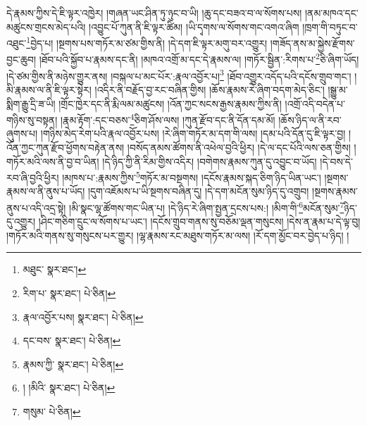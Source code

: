 དེ་རྣམས་ཀྱིས་དེ་ཇི་ལྟར་འཁྱེར། །གཞན་ཡང་ཤིན་ཏུ་ཉུང་བ་ཡི། །ཆུ་དང་བཟའ་བ་ལ་སོགས་པས། །ནམ་མཁའ་དང་མཚུངས་གྲངས་མེད་པའི། །འབྱུང་པོ་ཀུན་ནི་ཇི་ལྟར་ཚིམ། །ཡི་དྭགས་ལ་སོགས་གང་འགའ་ཞིག །ཁྲག་གི་བཏུང་བ་འཐུང་\footnote{མཐུང་  སྣར་ཐང་། }བྱེད་པ། །སྔགས་པས་གཏོར་མ་ཙམ་གྱིས་ནི། །དེ་དག་ཇི་ལྟར་མགུ་བར་འགྱུར། །གཟོད་ནས་མ་སྐྱེས་རྫོགས་བྱང་ཆུབ། །ཐོབ་པའི་སྐྱོབ་པ་རྣམས་དང་ནི། །མཁའ་འགྲོ་མ་དང་དེ་རྣམས་ལ། །གཏོར་སྦྱིན་:རིགས་པ་\footnote{རིག་པ་  སྣར་ཐང་།  པེ་ཅིན། }ཅི་ཞིག་ཡོད། །དེ་ཙམ་གྱིས་ནི་མཉེས་གྱུར་ནས། །བསྐལ་པ་མང་པོར་:རྣལ་འབྱོར་པ།\footnote{རྣལ་འབྱོར་པས།  སྣར་ཐང་།  པེ་ཅིན། } །ཐོབ་འགྱུར་འདོད་པའི་དངོས་གྲུབ་གང་། །མི་རྣམས་ལ་ནི་ཇི་ལྟར་སྟེར། །འདིར་ནི་བརྗོད་བྱ་རང་བཞིན་གྱིས། །ཆོས་རྣམས་རེ་ཞིག་བདག་མེད་ཅིང་། །སྒྱུ་མ་སྨིག་རྒྱུ་དྲི་ཟ་ཡི། །གྲོང་ཁྱེར་དང་ནི་རྨི་ལམ་མཚུངས། །འོན་ཀྱང་སངས་རྒྱས་རྣམས་ཀྱིས་ནི། །འགྲོ་འདི་བདེན་པ་གཉིས་སུ་བསྟན། །རྣམ་རྟོག་:དང་བཅས་\footnote{དང་བས་  སྣར་ཐང་།  པེ་ཅིན། }ཅིག་ཤོས་ལས། །ཀུན་རྫོབ་དང་ནི་དོན་དམ་མོ། །ཆོས་ཉིད་ལ་ནི་རབ་ཞུགས་པ། །གཉིས་མེད་རེག་པའི་རྣལ་འབྱོར་པས། །རེ་ཞིག་གཏོར་མ་དག་གི་ལས། །དམ་པའི་དོན་དུ་ཇི་ལྟར་བྱ། །འོན་ཀྱང་ཀུན་རྫོབ་ཕྱོགས་བརྟེན་ནས། །བསོད་ནམས་ཚོགས་ནི་འཕེལ་བྱའི་ཕྱིར། །དེ་ལ་དང་པོའི་ལས་ཅན་གྱིས། །གཏོར་མའི་ལས་ནི་བྱ་བ་ཡིན། །དེ་ཉིད་ཀྱི་ནི་རིམ་གྱིས་འདིར། །བགེགས་རྣམས་ཀུན་དུ་འབྱུང་བ་ཡོད། །དེ་བས་དེ་རབ་ཞི་བྱའི་ཕྱིར། །མཁས་པ་:རྣམས་ཀྱིས་\footnote{རྣམས་ཀྱི་  སྣར་ཐང་།  པེ་ཅིན། }གཏོར་མ་བསྔགས། །དངོས་རྣམས་སྐད་ཅིག་ཉིད་ཡིན་ཡང་། །སྔགས་རྣམས་ལ་ནི་ནུས་པ་ཡོད། །དུག་འཇོམས་པ་ཡི་སྔགས་བཞིན་དུ། །དེ་དག་མངོན་སུམ་ཉིད་དུ་འགྲུབ། །སྔགས་རྣམས་ནུས་པ་འདི་འདྲ་སྟེ། །མི་སྣང་ལྷ་ཚོགས་གང་ཡིན་པ། །དེ་ཉིད་རེ་ཞིག་སྤྱན་དྲངས་པས:། །མིག་གི་\footnote{། །མིའི་  སྣར་ཐང་།  པེ་ཅིན། }མངོན་སུམ་\footnote{གསུམ་  པེ་ཅིན། }ཉིད་དུ་འགྱུར། །ཤིང་གཅིག་དྲུང་ལ་སོགས་པ་ཡང་། །དངོས་གྲུབ་གནས་སུ་བཅོམ་ལྡན་གསུངས། །དེས་ན་རྣམ་པ་དེ་ལྟ་བུ། །གཏོར་མའི་གནས་སུ་གསུངས་པར་གྱུར། །ལྷ་རྣམས་རང་མཐུས་གཏོར་མ་ལས། །རོ་དག་མྱོང་བར་བྱེད་པ་ཉིད། །
